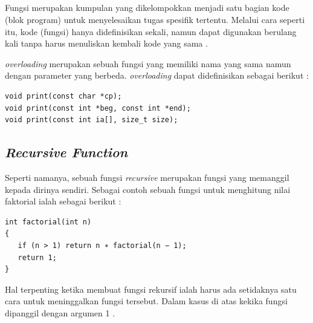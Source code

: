 \documentclass[../main.tex]{subfiles}
\begin{document}
    \subsection{{\Function}}
    Fungsi merupakan kumpulan {\statement} yang dikelompokkan menjadi satu bagian kode (blok program) untuk menyelesaikan tugas spesifik tertentu. Melalui cara seperti itu, kode (fungsi) hanya didefinisikan sekali, namun dapat digunakan berulang kali tanpa harus menuliskan kembali kode yang sama \parencite{raharjo2015pemrograman}.

    {\Function} \textit{overloading} merupakan sebuah fungsi yang memiliki nama yang sama namun dengan parameter yang berbeda. {\Function} \textit{overloading} dapat didefinisikan sebagai berikut \parencite{Lippman_Lajoie_Moo_2013}:

\begin{code}
\begin{verbatim}
void print(const char *cp);
void print(const int *beg, const int *end);
void print(const int ia[], size_t size);
\end{verbatim}
\end{code}

\subsection{\textit{Recursive Function}}
Seperti namanya, sebuah fungsi \textit{recursive} merupakan fungsi yang memanggil kepada dirinya sendiri. Sebagai contoh sebuah fungsi untuk menghitung nilai faktorial ialah sebagai berikut \parencite{grimes2017beginning}:

\begin{code}
\begin{verbatim}
int factorial(int n)
{
   if (n > 1) return n ∗ factorial(n − 1);
   return 1;
}
\end{verbatim}
\end{code}

Hal terpenting ketika membuat fungsi rekursif ialah harus ada setidaknya satu cara untuk meninggalkan fungsi tersebut. Dalam kasus di atas kekika fungsi  dipanggil dengan argumen 1 \parencite{grimes2017beginning}.
\end{document}
